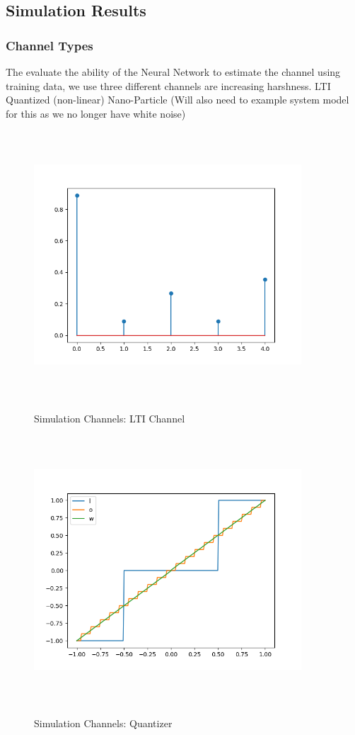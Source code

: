 \documentclass[12pt,a4paper]{article}
\begin{document}
\subsection{Simulation Results}
\subsubsection{Channel Types}
The evaluate the ability of the Neural Network to estimate the channel using training data, we use three different channels are increasing harshness. 
LTI
Quantized (non-linear)
Nano-Particle (Will also need to example system model for this as we no longer have white noise)


\begin{figure}[H]
\centering
	  \caption{Simulation Channels: LTI Channel}
	\includegraphics[width=10cm,height = 10cm]{system_model/lti_channel}
	  \label{fig:LTI Channel}
\end{figure}
\begin{figure}[H]
\centering
	  \caption{Simulation Channels: Quantizer}
	\includegraphics[width=10cm,height = 10cm]{system_model/quantizer}
	  \label{fig:Quantized Channel}
\end{figure}
\end{document}
